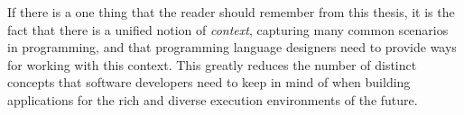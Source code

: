 \noindent
If there is a one thing that the reader should remember from this thesis, it is the fact that
there is a unified notion of \emph{context}, capturing many common scenarios in programming,
and that programming language designers need to provide ways for working with this context.
This greatly reduces the number of distinct concepts that software
developers need to keep in mind of when building applications for the rich and diverse
execution environments of the future.
